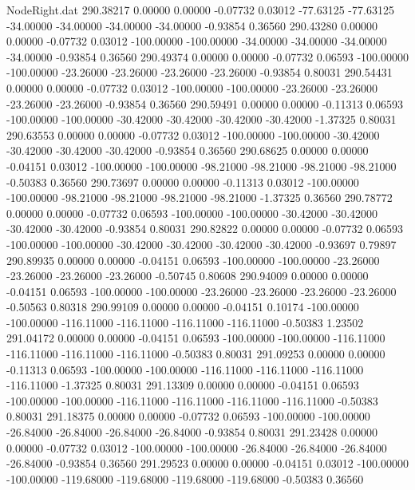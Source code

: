 \begin{filecontents}{NodeRight.dat}
 290.38217    0.00000    0.00000    -0.07732    0.03012  -77.63125  -77.63125  -34.00000  -34.00000  -34.00000  -34.00000   -0.93854    0.36560
 290.43280    0.00000    0.00000    -0.07732    0.03012 -100.00000 -100.00000  -34.00000  -34.00000  -34.00000  -34.00000   -0.93854    0.36560
 290.49374    0.00000    0.00000    -0.07732    0.06593 -100.00000 -100.00000  -23.26000  -23.26000  -23.26000  -23.26000   -0.93854    0.80031
 290.54431    0.00000    0.00000    -0.07732    0.03012 -100.00000 -100.00000  -23.26000  -23.26000  -23.26000  -23.26000   -0.93854    0.36560
 290.59491    0.00000    0.00000    -0.11313    0.06593 -100.00000 -100.00000  -30.42000  -30.42000  -30.42000  -30.42000   -1.37325    0.80031
 290.63553    0.00000    0.00000    -0.07732    0.03012 -100.00000 -100.00000  -30.42000  -30.42000  -30.42000  -30.42000   -0.93854    0.36560
 290.68625    0.00000    0.00000    -0.04151    0.03012 -100.00000 -100.00000  -98.21000  -98.21000  -98.21000  -98.21000   -0.50383    0.36560
 290.73697    0.00000    0.00000    -0.11313    0.03012 -100.00000 -100.00000  -98.21000  -98.21000  -98.21000  -98.21000   -1.37325    0.36560
 290.78772    0.00000    0.00000    -0.07732    0.06593 -100.00000 -100.00000  -30.42000  -30.42000  -30.42000  -30.42000   -0.93854    0.80031
 290.82822    0.00000    0.00000    -0.07732    0.06593 -100.00000 -100.00000  -30.42000  -30.42000  -30.42000  -30.42000   -0.93697    0.79897
 290.89935    0.00000    0.00000    -0.04151    0.06593 -100.00000 -100.00000  -23.26000  -23.26000  -23.26000  -23.26000   -0.50745    0.80608
 290.94009    0.00000    0.00000    -0.04151    0.06593 -100.00000 -100.00000  -23.26000  -23.26000  -23.26000  -23.26000   -0.50563    0.80318
 290.99109    0.00000    0.00000    -0.04151    0.10174 -100.00000 -100.00000 -116.11000 -116.11000 -116.11000 -116.11000   -0.50383    1.23502
 291.04172    0.00000    0.00000    -0.04151    0.06593 -100.00000 -100.00000 -116.11000 -116.11000 -116.11000 -116.11000   -0.50383    0.80031
 291.09253    0.00000    0.00000    -0.11313    0.06593 -100.00000 -100.00000 -116.11000 -116.11000 -116.11000 -116.11000   -1.37325    0.80031
 291.13309    0.00000    0.00000    -0.04151    0.06593 -100.00000 -100.00000 -116.11000 -116.11000 -116.11000 -116.11000   -0.50383    0.80031
 291.18375    0.00000    0.00000    -0.07732    0.06593 -100.00000 -100.00000  -26.84000  -26.84000  -26.84000  -26.84000   -0.93854    0.80031
 291.23428    0.00000    0.00000    -0.07732    0.03012 -100.00000 -100.00000  -26.84000  -26.84000  -26.84000  -26.84000   -0.93854    0.36560
 291.29523    0.00000    0.00000    -0.04151    0.03012 -100.00000 -100.00000 -119.68000 -119.68000 -119.68000 -119.68000   -0.50383    0.36560

\end{filecontents}
